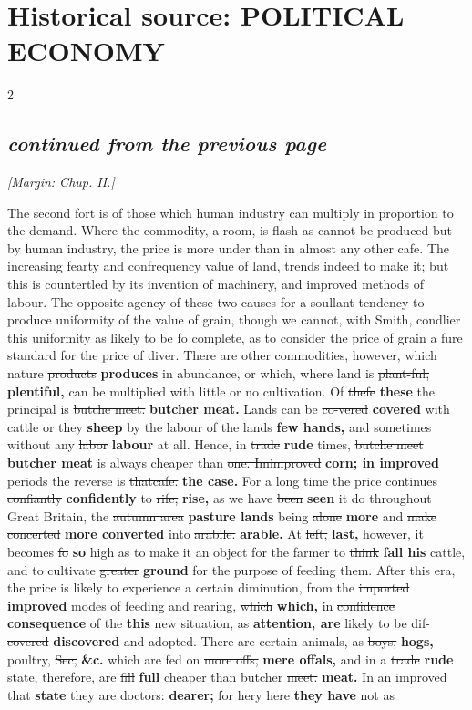 \documentclass[10pt]{article}
\begin{document}
\section*{Historical source: POLITICAL ECONOMY}
\begin{multicols}{2}
\subsection*{\textit{continued from the previous page}}
{\small\itshape [Margin: Chup. II.]}\par
The second fort is of those which human industry can multiply in proportion to the demand. Where the commodity, a room, is flash as cannot be produced but by human industry, the price is more under than in almost any other cafe. The increasing fearty and confrequency value of land, trends indeed to make it; but this is countertled by its invention of machinery, and improved methods of labour. The opposite agency of these two causes for a soullant tendency to produce uniformity of the value of grain, though we cannot, with Smith, condlier this uniformity as likely to be fo complete, as to consider the price of grain a fure standard for the price of diver. There are other commodities, however, which nature \sout{products} \textbf{produces} in abundance, or which, where land is \sout{plant-ful,} \textbf{plentiful,} can be multiplied with little or no cultivation. Of \sout{thefe} \textbf{these} the principal is \sout{butche meet.} \textbf{butcher meat.} Lands can be \sout{co-vered} \textbf{covered} with cattle or \sout{they} \textbf{sheep} by the labour of \sout{the lands} \textbf{few hands,} and sometimes without any \sout{labor} \textbf{labour} at all. Hence, in \sout{trade} \textbf{rude} times, \sout{butche meet} \textbf{butcher meat} is always cheaper than \sout{one. Imimproved} \textbf{corn; in improved} periods the reverse is \sout{thatcafe.} \textbf{the case.} For a long time the price continues \sout{confiantly} \textbf{confidently} to \sout{rife,} \textbf{rise,} as we have \sout{been} \textbf{seen} it do throughout Great Britain, the \sout{autumn area} \textbf{pasture lands} being \sout{alone} \textbf{more} and \sout{make concerted} \textbf{more converted} into \sout{arabile.} \textbf{arable.} At \sout{left,} \textbf{last,} however, it becomes \sout{fo} \textbf{so} high as to make it an object for the farmer to \sout{think} \textbf{fall his} cattle, and to cultivate \sout{greater} \textbf{ground} for the purpose of feeding them. After this era, the price is likely to experience a certain diminution, from the \sout{imported} \textbf{improved} modes of feeding and rearing, \sout{which} \textbf{which,} in \sout{confidence} \textbf{consequence} of \sout{the} \textbf{this} new \sout{situation, as} \textbf{attention, are} likely to be \sout{dif-covered} \textbf{discovered} and adopted. There are certain animals, as \sout{boys,} \textbf{hogs,} poultry, \sout{Sec,} \textbf{\&c.} which are fed on \sout{more offs,} \textbf{mere offals,} and in a \sout{trade} \textbf{rude} state, therefore, are \sout{fill} \textbf{full} cheaper than butcher \sout{meet.} \textbf{meat.} In an improved \sout{that} \textbf{state} they are \sout{doctors:} \textbf{dearer;} for \sout{hery here} \textbf{they have} not as 
\end{multicols}
\end{document}
